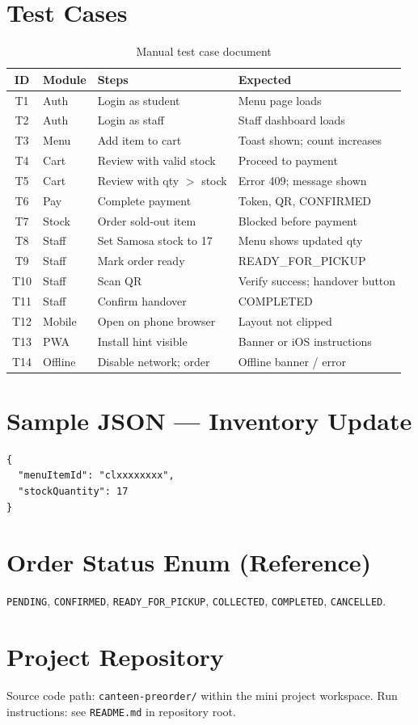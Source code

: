 \section{Test Cases}
\label{app:tests}
\begin{table}[H]
  \centering
  \caption{Manual test case document}
  \tablebodysetup
  \begin{tabularx}{\textwidth}{@{}c l Y Y@{}}
    \toprule
    \textbf{ID} & \textbf{Module} & \textbf{Steps} & \textbf{Expected} \\
    \midrule
    T1 & Auth & Login as student & Menu page loads \\
    T2 & Auth & Login as staff & Staff dashboard loads \\
    T3 & Menu & Add item to cart & Toast shown; count increases \\
    T4 & Cart & Review with valid stock & Proceed to payment \\
    T5 & Cart & Review with qty $>$ stock & Error 409; message shown \\
    T6 & Pay & Complete payment & Token, QR, CONFIRMED \\
    T7 & Stock & Order sold-out item & Blocked before payment \\
    T8 & Staff & Set Samosa stock to 17 & Menu shows updated qty \\
    T9 & Staff & Mark order ready & READY\_FOR\_PICKUP \\
    T10 & Staff & Scan QR & Verify success; handover button \\
    T11 & Staff & Confirm handover & COMPLETED \\
    T12 & Mobile & Open on phone browser & Layout not clipped \\
    T13 & PWA & Install hint visible & Banner or iOS instructions \\
    T14 & Offline & Disable network; order & Offline banner / error \\
    \bottomrule
  \end{tabularx}
\end{table}

\section{Sample JSON --- Inventory Update}
\begin{lstlisting}[caption={PATCH /api/inventory --- set 17 samosas}]
{
  "menuItemId": "clxxxxxxxx",
  "stockQuantity": 17
}
\end{lstlisting}

\section{Order Status Enum (Reference)}
\texttt{PENDING}, \texttt{CONFIRMED}, \texttt{READY\_FOR\_PICKUP}, \texttt{COLLECTED}, \texttt{COMPLETED}, \texttt{CANCELLED}.

\section{Project Repository}
Source code path: \texttt{canteen-preorder/} within the mini project workspace. Run instructions: see \texttt{README.md} in repository root.

